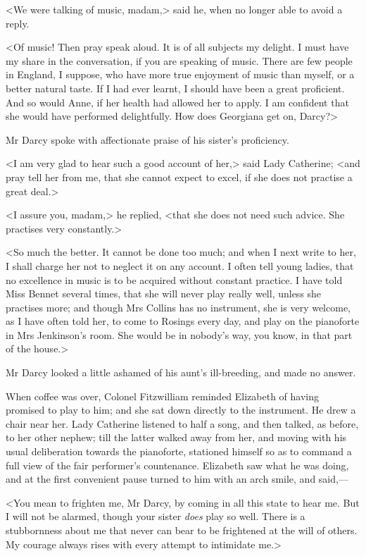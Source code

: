 <We were talking of music, madam,> said he, when no longer able to avoid a reply.

<Of music! Then pray speak aloud. It is of all subjects my delight. I must have my share in the conversation, if you are speaking of music. There are few people in England, I suppose, who have more true enjoyment of music than myself, or a better natural taste. If I had ever learnt, I should have been a great proficient. And so would Anne, if her health had allowed her to apply. I am confident that she would have performed delightfully. How does Georgiana get on, Darcy?>

Mr Darcy spoke with affectionate praise of his sister's proficiency.

<I am very glad to hear such a good account of her,> said Lady Catherine; <and pray tell her from me, that she cannot expect to excel, if she does not practise a great deal.>

<I assure you, madam,> he replied, <that she does not need such advice. She practises very constantly.>

<So much the better. It cannot be done too much; and when I next write to her, I shall charge her not to neglect it on any account. I often tell young ladies, that no excellence in music is to be acquired without constant practice. I have told Miss Bennet several times, that she will never play really well, unless she practises more; and though Mrs Collins has no instrument, she is very welcome, as I have often told her, to come to Rosings every day, and play on the pianoforte in Mrs Jenkinson's room. She would be in nobody's way, you know, in that part of the house.>

Mr Darcy looked a little ashamed of his aunt's ill-breeding, and made no answer.

When coffee was over, Colonel Fitzwilliam reminded Elizabeth of having promised to play to him; and she sat down directly to the instrument. He drew a chair near her. Lady Catherine listened to half a song, and then talked, as before, to her other nephew; till the latter walked away from her, and moving with his usual deliberation towards the pianoforte, stationed himself so as to command a full view of the fair performer's countenance. Elizabeth saw what he was doing, and at the first convenient pause turned to him with an arch smile, and said,—

<You mean to frighten me, Mr Darcy, by coming in all this state to hear me. But I will not be alarmed, though your sister \textit{does} play so well. There is a stubbornness about me that never can bear to be frightened at the will of others. My courage always rises with every attempt to intimidate me.>

